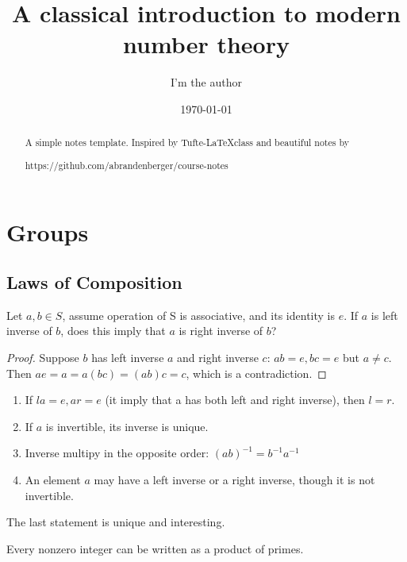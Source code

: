 \documentclass{tufte-handout}
\title{\centering A classical introduction to modern number theory}
\author{I'm the author}
\date{\today} %
\begin{document}
\maketitle%

\begin{abstract}
\noindent
A simple notes template. Inspired by Tufte-\LaTeX class and beautiful notes by \begin{verbatim*}
	https://github.com/abrandenberger/course-notes
\end{verbatim*}
\end{abstract}


\section{Groups}\label{sec:groups}

\subsection{Laws of Composition}


\begin{problem}
	\normalfont
	Let $a, b\in S$, assume operation of S is associative, and its identity is $e$. If $a$ is left inverse of $b$, does this imply that $a$ is right inverse of $b$?
\end{problem}

\begin{proof}
	Suppose $b$ has left inverse $a$ and right inverse $c$: $ab = e, bc = e$ but $a\neq c$. Then $ae = a = a(bc)=(ab)c=c$, which is a contradiction.
\end{proof}

\begin{enumerate}
	\item If $la=e,ar=e$ (it imply that a has both left and right inverse), then $l=r$.
	\item If $a$ is invertible, its inverse is unique.
	\item Inverse multipy in the opposite order: $(ab)^{-1}=b^{-1}a^{-1}$
	\item An element $a$ may have a left inverse or a right inverse, though it is not invertible.
\end{enumerate}

The last statement is unique and interesting.

\begin{lemma}
	\normalfont
	Every nonzero integer can be written as a product of primes.
\end{lemma}
\end{document}
